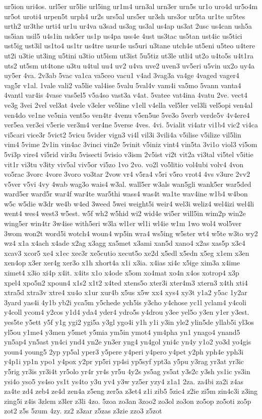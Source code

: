 {ur5ion
uri4os.
url5er
ur5lie
url5ing
ur1m4
urn3al
urn3er
urn5s
ur1o
uro4d
ur5o4m
ur5ot
uroti4
urpen5t
urph4
ur2s
urs5al
urs5er
ur3sh
urs3or
ur5ta
ur1te
ur5tes
urth2
ur3the
urti4
ur1u
ur4va
u3sad
us3ag
us3al
us4ap
us3at
2usc
us4can
ush5a
us5ian
usil5
u4s1in
usk5er
us1p
us4pa
uss4e
4ust
us3tac
us5tan
ust4ic
us5tici
ust5ig
ust3il
us1to4
us1tr
us4tre
usur4e
us5uri
u3tane
utch4e
ut5eni
u5teo
u4tere
ut2i
u3tie
ut3ing
u5tini
u3tio
ut5ism
ut3ist
5u5tiz
ut3le
utli4
ut2o
u4to5s
u4t1ra
uts2
ut5sm
ut4tone
u3tu
u4tul
uu4
uv2
u4va
uve2
uven3
uv5eri
u5vin
ux2o
uy4a
uy5er
4va.
2v3ab
5vac
va1ca
va5ceo
vacu1
v4ad
3vag3a
va4ge
4vaged
vager4
vag5r
v1al.
1vale
vali2
va5lie
val4ise
5valu
5val4v
vam4i
va5mo
5vann
vanta4
4vantl
var4is
4vase
vas5el5
v5a4so
vast3a
v4at.
5vatee
vat4ina
4vatu
2ve.
vect4
ve3g
3vei
2vel
vel3at
4vele
v3eler
ve5line
v1ell
v4ella
vel5ler
vel3li
vel5opi
ven4al
ven4do
ve1ne
ve5nia
vent5o
ven4tr
4venu
v5en5ue
5ve3o
5verb
verde5v
4v4ere4
ver5ea
ver3ei
v5erie
ver3m4
ver4ne
5verse
4ves.
4vi.
5vialit
vi4atr
vi1b4
vic2
vi4ca
vi5cari
vice3r
5vict2
5vicu
5vider
vign3
vi4l
vil3i
3vili4a
v5ilise
v5ilize
vil5lin
vim4
5vime
2v1in
vin4ac
3vinci
vin2e
5vinit
v5iniz
vint4
vin5ta
3vi1o
viol3
vi5om
5vi3p
vire4
vi5rid
vir3u
5visecti
5visio
v3ism
2v5ist
vi2t
vit2a
vi3tal
vi5tel
v5itie
vit1r
vi3tu
v3ity
viv5al
viv5or
vi5zo
1vo
2vo.
vo2l
vo5litio
vol4ubi
volv4
4von
vo5rac
3vorc
4vore
3voro
vo3tar
2vow
vr4
v5ra4
v5ri
v5ro
vrot4
4vs
v3ure
2vv2
v5ver
v5vi
4vy
4wab
wag3o
wais4
w3al.
wall5er
w3als
wan5gli
wank5er
war5ded
ward5er
ward5r
war4f
war4te
war5thi
wass4
was4t
wa1te
wav4ine
w1b4
w4bon
w5c
w5die
w3dr
we4b
w4ed
3weed
5wei
weight5i
weir4
wel3i
weliz4
wel4izi
wel4li
went4
wes4
west3
w5est.
w5f
wh2
w5hid
wi2
wid4e
wi5er
will5in
wim2p
win2e
wing5er
win4tr
3w4ise
with5eri
w3la
wl1er
wl1i
wl4ie
w1m
1wo
wol4
wol5ver
3wom
won2t
word5i
wotch4
woun4
wp5in
wra4
ws5ing
w5ster
wt4
w5te
w3to
wy2
wz4
x1a
x4ach
x4ade
x2ag
x3agg
xa5met
x3ami
xan5d
xano4
x2as
xas5p
x3c4
xcav3
xcor5
xe4
x1ec
xec3r
xe5cutio
xecut5o
xe2d
x5edl
x5edn
x5eg
x1em
x3en
xen4op
x3er
xer4g
xer3o
x1h
xhort4a
x1i
x3ia.
x4ias
xi4c
x5ige
xim3a
x4ime
ximet4
x3io
xi4p
x4it.
x4its
x1o
x4ode
x5om
xo4mat
xo4n
x4os
xotrop4
x3p
xpel4
xpo5n2
xpoun4
x1s2
x1t2
x4ted
xtens5o
xter3i
xter4m3
xtern3
x4th
xti4
xtra5d
xtra3v
xtre4
xu4o
x1ur
xur4b
x5us
x5w
xx4
xys4
xy3t
y1a2
y5ac
1y2ar
3yard
yas4i
4y1b
yb2i
yca5m
y5chede
ych5is
y3cho
y4chose
yc1l
yclam4
y4coli
y4coll
ycom4
y2cos
y1d4
yda4
yder4
ydro5s
y4drou
y3ee
yel5o
y3en
y1er
y3est.
yes5te
y5ett
y5f
y1g
ygi2
ygi5a
y3gl
ygo4i
y1h
y1i
y3in
yle2
ylin5de
yllab5i
yl3os
yl5ou
y1me4
y3men
y5met
y5mia
ym5in
ymot4
ym4pha
yn1
ynago4
ynand5
yn5ap4
yn5ast
yn4ci
ynd4
yn2e
yn3er
yng4
yn4gol
yni4c
yn4y
y1o2
yo3d
yo4gis
youn4
young5
2yp
yp5al
yper3
y5pere
y4peri
y4pero
y4pet
y2ph
yph4e
yph3i
y4p1i
yp1n
ypo1
y4pox
y2pr
yp5ri
yp4si
yp5syf
ypt3a
y5pu
y3rag
yr3at
yr3ic
y5rig
yr3is
yr3i4t
yr5olo
yr4r
yr4s
yr5u
4y2s
ys5ag
ys5at
y3s2c
y3sh
ys1ic
ys3in
ysi4o
yso5
ys4so
ys1t
ys4to
y3u
yv4
y3w
yz5er
yzy4
z1a1
2za.
za4bi
za2i
z4as
za4te
zd4
zeb4
ze4d
zen4a
z5eng
zer5a
z3et4
z1i
zib5
5zic4
z2ie
zi5m
zin4c3i
z3ing
zing5i
z4is
3zlem
z3ler
z3li
4zo.
5zoa
zo3an
3zoo2
zo3ol
zo3on
zo5op
zo5oti
zo5p
zot2
z5s
5zum
4zy.
zz2
z3zar
z5zas
z3zie
zzo3
z5zot
}
